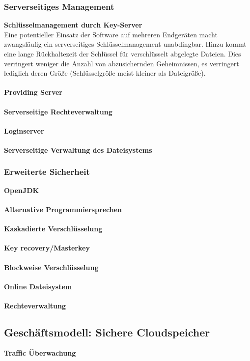 \documentclass[12pt,a4paper,bibliography=totocnumbered,listof=totocnumbered]{scrartcl}
\begin{document}
\subsubsection{Serverseitiges Management}
\textbf{Schlüsselmanagement durch Key-Server}\\
Eine potentieller Einsatz der Software auf mehreren Endgeräten macht zwangsläufig ein serverseitiges Schlüsselmanagement unabdingbar. Hinzu kommt eine lange Rückhaltezeit der Schlüssel für verschlüsselt abgelegte Dateien. Dies verringert weniger die Anzahl von abzusichernden Geheimnissen, es verringert lediglich deren Größe (Schlüsselgröße meist kleiner als Dateigröße).\\ \cite{38}
\\\textbf{Providing Server}\\
\\\textbf{Serverseitige Rechteverwaltung}\\
\\\textbf{Loginserver}\\
\\\textbf{Serverseitige Verwaltung des Dateisystems}\\

\subsubsection{Erweiterte Sicherheit}
\textbf{OpenJDK}\\
\\\textbf{Alternative Programmiersprechen}\\
\\\textbf{Kaskadierte Verschlüsselung}\\
\\\textbf{Key recovery/Masterkey}\\
\\\textbf{Blockweise Verschlüsselung}\\
\\\textbf{Online Dateisystem}\\
\\\textbf{Rechteverwaltung}\\

\subsection{Geschäftsmodell: Sichere Cloudspeicher}
\textbf{Traffic Überwachung}\\
\pagebreak
\end{document}
